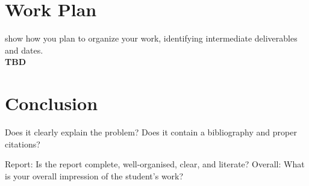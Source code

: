 \documentclass{mprop}
\begin{document}
\section{Work Plan}

show how you plan to organize your work, identifying intermediate deliverables
and dates.\\
\textbf{TBD}

\section{Conclusion}

Does it clearly explain the problem? Does it contain a bibliography and proper
citations?

Report: Is the report complete, well-organised, clear, and literate? Overall:
What is your overall impression of the student’s work?

\pagebreak


\end{document}
